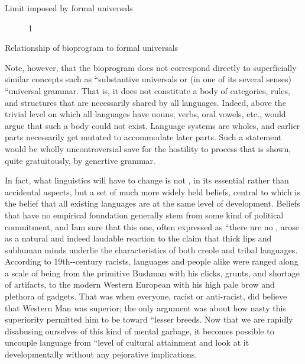 Limit imposed by formal universals

\begin{figure}
\caption{1}
\label{fig:5}
\end{figure}

Relationship of bioprogram to formal universals

Note, however, that the bioprogram does not correspond directly to superficially similar concepts such as ``substantive universals or (in one of its several senses) ``universal grammar. That is, it does not constitute a body of categories, rules, and structures that are necessarily shared by all languages. Indeed, above the trivial level on which all languages have nouns, verbs, oral vowels, etc., would argue that such a body could not exist. Language systems are wholes, and earlier parts necessarily get mutated to accommodate later parts. Such a statement would be wholly uncontroversial save for the hostility to process that is shown, quite gratuitously, by genertive grammar.


In fact, what linguistics will have to change is not , in its essential rather than accidental aspects, but a set of much more widely held beliefs, central to which is the belief that all existing languages are at the same level of development. Beliefs that have no empirical foundation generally stem from some kind of politi\-cal commitment, and Iam sure that this one, often expressed as ``there are no , arose as a natural and indeed laudable reaction to the claim that thick lips and subhuman minds underlie the characteristics of both creole and tribal languages. According to 19th-{}-century racists, languages and people alike were ranged along a scale of being from the primitive Bushman with his clicks, grunts, and shortage of artifacts, to the modern Western European with his high pale brow and plethora of gadgets. That was when everyone, racist or anti-racist, did believe that Western Man was superior; the only argument was about how nasty this superiority permitted him to be toward ``lesser breeds. Now that we are rapidly disabusing our\-selves of this kind of mental garbage, it becomes possible to uncouple language from ``level of cultural attainment and look at it develop\-mentally without any pejorative implications.

